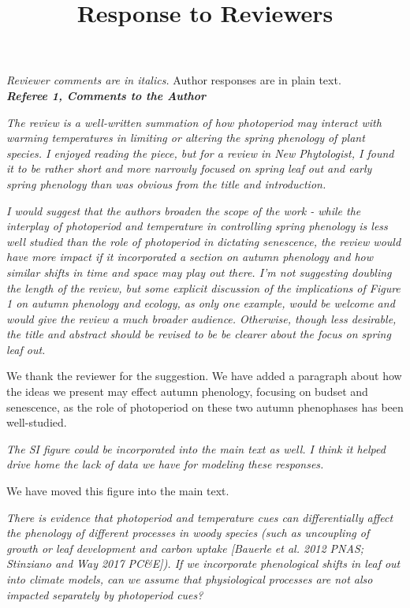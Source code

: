 \documentclass{article}
\begin{document}
\setlength\parindent{0pt}

\title{Response to Reviewers}
\emph{Reviewer comments are in italics.} Author responses are in plain text.\\

\emph{{\bf Referee 1, Comments to the Author}}

\par \emph{The review is a well-written summation of how photoperiod may interact with warming temperatures in limiting or altering the spring phenology of plant species. I enjoyed reading the piece, but for a review in New Phytologist, I found it to be rather short and more narrowly focused on spring leaf out and early spring phenology than was obvious from the title and introduction.}

\par \emph{I would suggest that the authors broaden the scope of the work - while the interplay of photoperiod and temperature in controlling spring phenology is less well studied than the role of photoperiod in dictating senescence, the review would have more impact if it incorporated a section on autumn phenology and how similar shifts in time and space may play out there. I'm not suggesting doubling the length of the review, but some explicit discussion of the implications of Figure 1 on autumn phenology and ecology, as only one example, would be welcome and would give the review a much broader audience. Otherwise, though less desirable, the title and abstract should be revised to be be clearer about the focus on spring leaf out.}
\par We thank the reviewer for the suggestion. We have added a paragraph about how the ideas we present may effect autumn phenology, focusing on budset and senescence, as the role of photoperiod on these two autumn phenophases has been well-studied. 

\par \emph{The SI figure could be incorporated into the main text as well. I think it helped drive home the lack of data we have for modeling these responses.}

\par We have moved this figure into the main text.

\par \emph{There is evidence that photoperiod and temperature cues can differentially affect the phenology of different processes in woody species (such as uncoupling of growth or leaf development and carbon uptake [Bauerle et al. 2012 PNAS; Stinziano and Way 2017 PC\&E]). If we incorporate phenological shifts in leaf out into climate models, can we assume that physiological processes are not also impacted separately by photoperiod cues?} 
\end{document}

